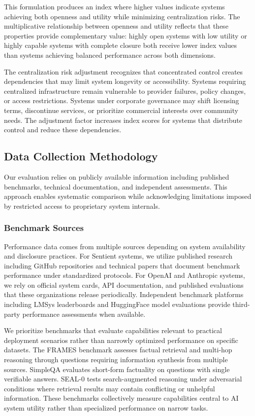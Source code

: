 This formulation produces an index where higher values indicate systems achieving both openness and utility while minimizing centralization risks. The multiplicative relationship between openness and utility reflects that these properties provide complementary value: highly open systems with low utility or highly capable systems with complete closure both receive lower index values than systems achieving balanced performance across both dimensions.

The centralization risk adjustment recognizes that concentrated control creates dependencies that may limit system longevity or accessibility. Systems requiring centralized infrastructure remain vulnerable to provider failures, policy changes, or access restrictions. Systems under corporate governance may shift licensing terms, discontinue services, or prioritize commercial interests over community needs. The adjustment factor increases index scores for systems that distribute control and reduce these dependencies.

\subsection{Data Collection Methodology}

Our evaluation relies on publicly available information including published benchmarks, technical documentation, and independent assessments. This approach enables systematic comparison while acknowledging limitations imposed by restricted access to proprietary system internals.

\subsubsection{Benchmark Sources}

Performance data comes from multiple sources depending on system availability and disclosure practices. For Sentient systems, we utilize published research including GitHub repositories \cite{ods_github2025, roma_github2025} and technical papers \cite{ods2025, roma2025} that document benchmark performance under standardized protocols. For OpenAI and Anthropic systems, we rely on official system cards, API documentation, and published evaluations that these organizations release periodically. Independent benchmark platforms including LMSys leaderboards and HuggingFace model evaluations provide third-party performance assessments when available.

We prioritize benchmarks that evaluate capabilities relevant to practical deployment scenarios rather than narrowly optimized performance on specific datasets. The FRAMES benchmark \cite{frames2024} assesses factual retrieval and multi-hop reasoning through questions requiring information synthesis from multiple sources. SimpleQA \cite{simpleqa2024} evaluates short-form factuality on questions with single verifiable answers. SEAL-0 \cite{sealqa2025} tests search-augmented reasoning under adversarial conditions where retrieval results may contain conflicting or unhelpful information. These benchmarks collectively measure capabilities central to AI system utility rather than specialized performance on narrow tasks.

